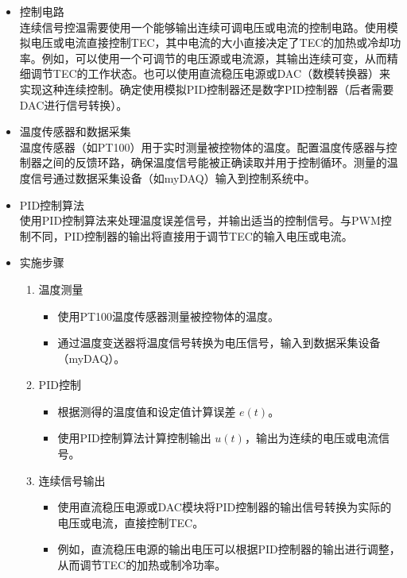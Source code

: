 \documentclass[dvipsnames, svgnames,a4paper,11pt]{article}
\begin{document}
	\begin{itemize}
		\item 控制电路\\
		连续信号控温需要使用一个能够输出连续可调电压或电流的控制电路。使用模拟电压或电流直接控制TEC，其中电流的大小直接决定了TEC的加热或冷却功率。例如，可以使用一个可调节的电压源或电流源，其输出连续可变，从而精细调节TEC的工作状态。也可以使用直流稳压电源或DAC（数模转换器）来实现这种连续控制。确定使用模拟PID控制器还是数字PID控制器（后者需要DAC进行信号转换）。
		
		\item 温度传感器和数据采集\\
		温度传感器（如PT100）用于实时测量被控物体的温度。配置温度传感器与控制器之间的反馈环路，确保温度信号能被正确读取并用于控制循环。测量的温度信号通过数据采集设备（如myDAQ）输入到控制系统中。
		
		\item PID控制算法\\
		使用PID控制算法来处理温度误差信号，并输出适当的控制信号。与PWM控制不同，PID控制器的输出将直接用于调节TEC的输入电压或电流。
		
		\item 实施步骤
		\begin{enumerate}
			\item 温度测量
			\begin{itemize}
				\item 使用PT100温度传感器测量被控物体的温度。
				\item 通过温度变送器将温度信号转换为电压信号，输入到数据采集设备（myDAQ）。
			\end{itemize}
			
			\item PID控制
			\begin{itemize}
				\item 根据测得的温度值和设定值计算误差 \( e(t) \)。
				\item 使用PID控制算法计算控制输出 \( u(t) \)，输出为连续的电压或电流信号。
			\end{itemize}
			
			\item 连续信号输出
			\begin{itemize}
				\item 使用直流稳压电源或DAC模块将PID控制器的输出信号转换为实际的电压或电流，直接控制TEC。
				\item 例如，直流稳压电源的输出电压可以根据PID控制器的输出进行调整，从而调节TEC的加热或制冷功率。
			\end{itemize}
		\end{enumerate}
		

\end{itemize}
\end{document}
